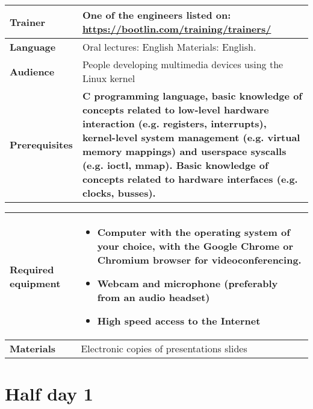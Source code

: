 \documentclass[a4paper,12pt,obeyspaces,spaces,hyphens]{article}
\begin{document}
{\begin{tabularx}{\textwidth}{|g|h|}
    {\bf Trainer} & One of the engineers listed on:
    \newline \url{https://bootlin.com/training/trainers/}\\
    \hline

    {\bf Language} & Oral lectures: English
    \newline Materials: English.\\
    \hline

    {\bf Audience} & People developing multimedia devices using the Linux kernel\\
    \hline

    {\bf Prerequisites} &
    {\bf C programming language, basic knowledge of concepts related to low-level
    hardware interaction (e.g. registers, interrupts),
    kernel-level system management (e.g. virtual memory mappings) and
    userspace syscalls (e.g. ioctl, mmap).
    Basic knowledge of concepts related to hardware interfaces
    (e.g. clocks, busses).}\\
    \hline

  \end{tabularx}

  \begin{tabularx}{\textwidth}{|g|h|}
    {\bf Required equipment} &
    \begin{itemize}
    \item Computer with the operating system of your choice, with the
          Google Chrome or Chromium browser for videoconferencing.
    \item Webcam and microphone (preferably from an audio headset)
    \item High speed access to the Internet
    \end{itemize}\\
    \hline

    {\bf Materials} & Electronic copies of presentations slides\\
    \hline

\end{tabularx}}
\normalsize

\section{Half day 1}
\end{document}
